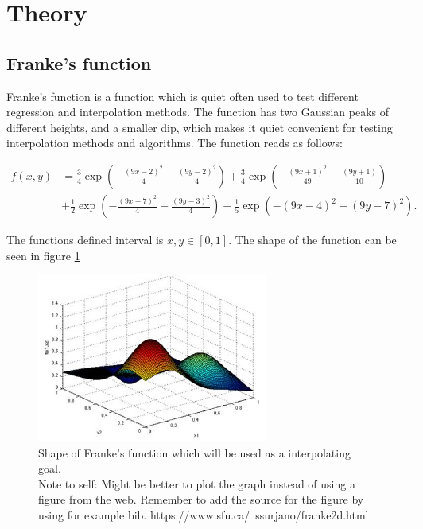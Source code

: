 \documentclass[../main.tex]{subfiles}
\begin{document}
\section{Theory}\label{sec:theory}
  \subsection{Franke's function}
Franke's function is a function which is quiet often used to test different regression and interpolation methods. The function has two Gaussian peaks of different heights, and a smaller dip, which makes it quiet convenient for testing interpolation methods and algorithms. The function reads as follows:

\begin{align*}
f(x,y) &= \frac{3}{4}\exp{\left(-\frac{(9x-2)^2}{4} - \frac{(9y-2)^2}{4}\right)}+\frac{3}{4}\exp{\left(-\frac{(9x+1)^2}{49}- \frac{(9y+1)}{10}\right)} \\
&+\frac{1}{2}\exp{\left(-\frac{(9x-7)^2}{4} - \frac{(9y-3)^2}{4}\right)} -\frac{1}{5}\exp{\left(-(9x-4)^2 - (9y-7)^2\right) }.
\end{align*}

The functions defined interval is $x,y\in[0,1]$. The shape of the function can be seen in figure \ref{frankesplot}

\begin{figure}[H]
\centering
\includegraphics[width = 3in]{frankesfunction_plot.png}
\caption{Shape of Franke's function which will be used as a interpolating goal.
\\Note to self: Might be better to plot the graph instead of using a figure from the web. Remember to add the source for the figure by using for example bib. https://www.sfu.ca/~ssurjano/franke2d.html}
\label{frankesplot}
\end{figure}
\end{document}
